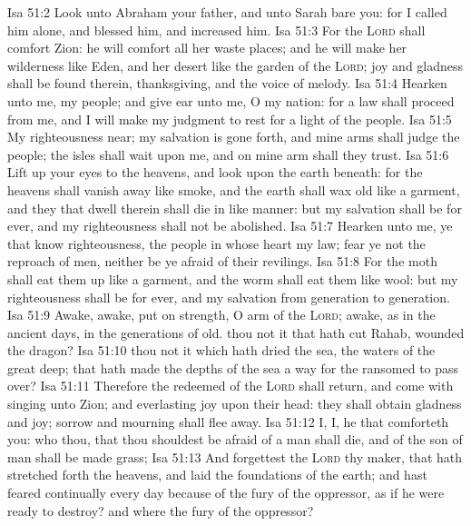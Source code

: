 \vs Isa 51:2 Look unto Abraham your father, and unto Sarah  bare you: for I called him alone, and blessed him, and increased him.
\vs Isa 51:3 For the \textsc{Lord} shall comfort Zion: he will comfort all her waste places; and he will make her wilderness like Eden, and her desert like the garden of the \textsc{Lord}; joy and gladness shall be found therein, thanksgiving, and the voice of melody.
\vs Isa 51:4 Hearken unto me, my people; and give ear unto me, O my nation: for a law shall proceed from me, and I will make my judgment to rest for a light of the people.
\vs Isa 51:5 My righteousness  near; my salvation is gone forth, and mine arms shall judge the people; the isles shall wait upon me, and on mine arm shall they trust.
\vs Isa 51:6 Lift up your eyes to the heavens, and look upon the earth beneath: for the heavens shall vanish away like smoke, and the earth shall wax old like a garment, and they that dwell therein shall die in like manner: but my salvation shall be for ever, and my righteousness shall not be abolished.
\vs Isa 51:7 Hearken unto me, ye that know righteousness, the people in whose heart  my law; fear ye not the reproach of men, neither be ye afraid of their revilings.
\vs Isa 51:8 For the moth shall eat them up like a garment, and the worm shall eat them like wool: but my righteousness shall be for ever, and my salvation from generation to generation.
\vs Isa 51:9 Awake, awake, put on strength, O arm of the \textsc{Lord}; awake, as in the ancient days, in the generations of old.  thou not it that hath cut Rahab,  wounded the dragon?
\vs Isa 51:10  thou not it which hath dried the sea, the waters of the great deep; that hath made the depths of the sea a way for the ransomed to pass over?
\vs Isa 51:11 Therefore the redeemed of the \textsc{Lord} shall return, and come with singing unto Zion; and everlasting joy  upon their head: they shall obtain gladness and joy;  sorrow and mourning shall flee away.
\vs Isa 51:12 I,  I,  he that comforteth you: who  thou, that thou shouldest be afraid of a man  shall die, and of the son of man  shall be made  grass;
\vs Isa 51:13 And forgettest the \textsc{Lord} thy maker, that hath stretched forth the heavens, and laid the foundations of the earth; and hast feared continually every day because of the fury of the oppressor, as if he were ready to destroy? and where  the fury of the oppressor?
